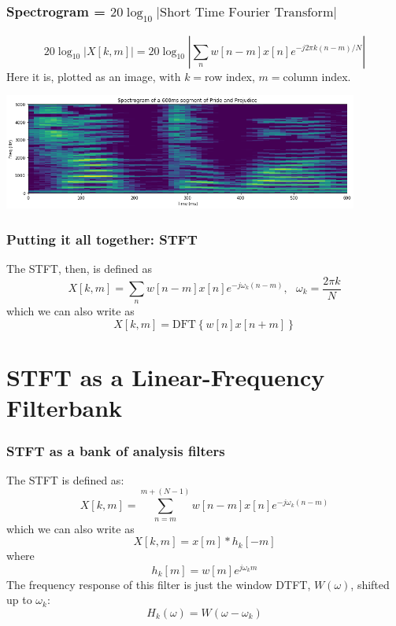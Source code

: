 \documentclass{beamer}
\begin{document}
\begin{frame}
  \frametitle{Spectrogram = $20\log_{10}|\mbox{Short Time Fourier Transform}|$}

  \[
  20\log_{10}|X[k,m]| = 20\log_{10}\left|\sum_{n}w[n-m]x[n]e^{-j2\pi k(n-m)/N}\right|
  \]
  Here it is, plotted as an image, with $k=$row index, $m=$column index.
  \centerline{\includegraphics[height=1.5in]{librivox_spectrograms.png}}
\end{frame}

\begin{frame}
  \frametitle{Putting it all together: STFT}
  The STFT, then, is defined as
  \[
  X[k,m]= \sum_{n} w[n-m]x[n]e^{-j\omega_k(n-m)},~~~\omega_k=\frac{2\pi k}{N}
  \]
  which we can also write as
  \[
  X[k,m] = \mbox{DFT}\left\{w[n]x[n+m]\right\}
  \]
\end{frame}

\section[Linear Frequency]{STFT as a Linear-Frequency Filterbank}
\setcounter{subsection}{1}

\begin{frame}
  \frametitle{STFT as a bank of analysis filters}

  The STFT is defined as:
  \[
  X[k,m] = \sum_{n=m}^{m+(N-1)} w[n-m]x[n]e^{-j\omega_k(n-m)}
  \]
  which we can also write as
  \[
  X[k,m] = x[m] \ast h_k[-m]
  \]
  where
  \[
  h_k[m] = w[m]e^{j\omega_k m}
  \]
  The frequency response of this filter is just the window DTFT,
  $W(\omega)$, shifted up to $\omega_k$:
  \[
  H_k(\omega) = W\left(\omega-\omega_k\right)
  \]
\end{frame}
\end{document}
